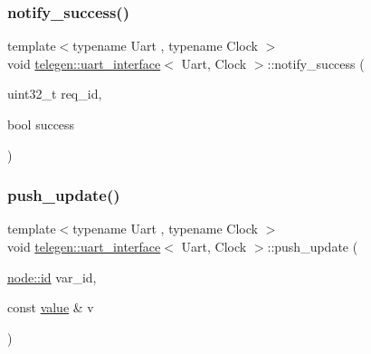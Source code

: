 \mbox{\label{classtelegen_1_1uart__interface_a4552980fe3db33e65c631c785fa7b743}} 
\subsubsection{\texorpdfstring{notify\+\_\+success()}{notify\_success()}}
{\footnotesize\ttfamily template$<$typename Uart , typename Clock $>$ \\
void \hyperlink{classtelegen_1_1uart__interface}{telegen\+::uart\+\_\+interface}$<$ Uart, Clock $>$\+::notify\+\_\+success (\begin{DoxyParamCaption}\item[{uint32\+\_\+t}]{req\+\_\+id,  }\item[{bool}]{success }\end{DoxyParamCaption})\hspace{0.3cm}{\ttfamily [inline]}}

\mbox{\label{classtelegen_1_1uart__interface_a27ccf80b5783baaa49300f27f061bd9f}} 
\subsubsection{\texorpdfstring{push\+\_\+update()}{push\_update()}}
{\footnotesize\ttfamily template$<$typename Uart , typename Clock $>$ \\
void \hyperlink{classtelegen_1_1uart__interface}{telegen\+::uart\+\_\+interface}$<$ Uart, Clock $>$\+::push\+\_\+update (\begin{DoxyParamCaption}\item[{\hyperlink{classtelegen_1_1node_aae3ff0d12932c55fdc88a1743e27ea56}{node\+::id}}]{var\+\_\+id,  }\item[{const \hyperlink{classtelegen_1_1value}{value} \&}]{v }\end{DoxyParamCaption})\hspace{0.3cm}{\ttfamily [inline]}}

\mbox{\label{classtelegen_1_1uart__interface_ac126173cdd9ffe15a33e248dc3e8c2fc}} 
